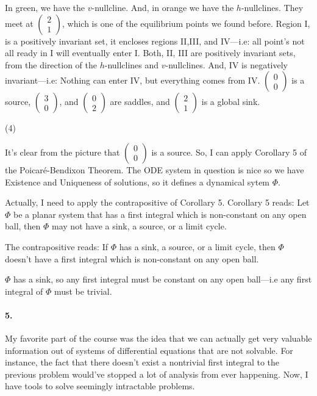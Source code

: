 \documentclass{article}
\begin{document}
In green, we have the $v$-nullcline. And, in orange we have the
$h$-nullclines. They meet at $\begin{pmatrix}
  2\\1\end{pmatrix}$, which is one of the equilibrium points we found
before. Region I, is a positively invariant set, it encloses regions II,III,
and IV---i.e: all point's not all ready in I will eventually enter
I. Both, II, III are positively invariant sets, from the direction of
the $h$-nullclines and $v$-nullclines. And, IV is negatively
invariant---i.e: Nothing can enter IV, but everything comes from IV. $\begin{pmatrix}
  0\\0\end{pmatrix}$ is a source, $\begin{pmatrix}
  3\\0\end{pmatrix}$, and $\begin{pmatrix}
  0\\2\end{pmatrix}$ are saddles, and $\begin{pmatrix}
  2\\1\end{pmatrix}$ is a global sink.

(4)

It's clear from the picture that $\begin{pmatrix}
  0\\0\end{pmatrix}$
is a source. So, I can
apply Corollary 5 of the Poicaré-Bendixon Theorem. The ODE system in question is
nice so we have Existence and Uniqueness of solutions, so it defines a dynamical
sytem $\Phi$.

Actually, I need to apply the contrapositive of Corollary 5. Corollary
5 reads: Let $\Phi$ be a planar system that has a first integral which
is non-constant on any open ball, then $\Phi$ may not have a sink, a
source, or a limit cycle.

The contrapositive reads: If $\Phi$ has a sink, a
source, or a limit cycle, then $\Phi$ doesn't have a first integral which
is non-constant on any open ball.

$\Phi$ has a sink, so any first integral must be constant on any open
ball---i.e any first integral of $\Phi$ must be trivial.

\paragraph{5.} My favorite part of the course was the idea that we can
actually get very valuable information out of systems of differential
equations that are not solvable. For instance, the fact that there
doesn't exist a nontrivial first integral to the previous problem
would've stopped a lot of analysis from ever happening. Now, I have
tools to solve seemingly intractable problems.
\end{document}
